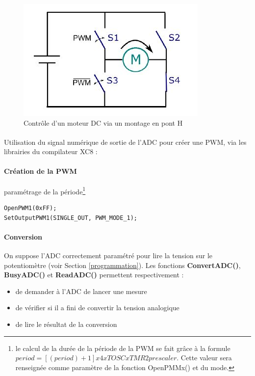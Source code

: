 \begin{figure}[h]
\begin{center}
\begin{framed}
\includegraphics[scale=0.8]{images/pontH.jpg}
\caption{Contrôle d'un moteur DC via un montage en pont H}
\label{pontH}
\end{framed}
\end{center}
\end{figure}

\paragraph{}
Utilisation du signal numérique de sortie de l'ADC pour créer une PWM, via les librairies du compilateur XC8 :

\paragraph{Création de la PWM} paramétrage de la période\footnote{
le calcul de la durée de la période de la PWM se fait grâce à la formule $period =[(period ) + 1] x 4 x TOSC x TMR2 prescaler$. Cette valeur sera renseignée comme paramètre de la fonction OpenPMMx() et du mode.}
\begin{lstlisting}
OpenPWM1(0xFF);
SetOutputPWM1(SINGLE_OUT, PWM_MODE_1);
\end{lstlisting}

\paragraph{Conversion} On suppose l'ADC correctement paramétré pour lire la tension sur le potentiomètre (voir Section \ref{programmation}).
Les fonctions \textbf{ConvertADC()}, \textbf{BusyADC()} et \textbf{ReadADC()} permettent respectivement : 
\begin{itemize}
\item de demander à l'ADC de lancer une mesure
\item de vérifier si il a fini de convertir la tension analogique
\item de lire le résultat de la conversion
\end{itemize}

